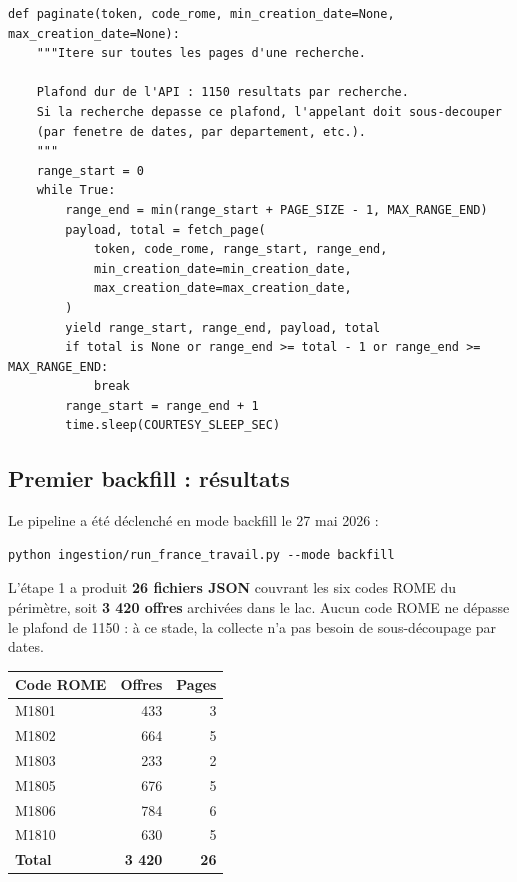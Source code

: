 \documentclass[12pt, a4paper]{article}
\begin{document}
\begin{lstlisting}[style=python]
def paginate(token, code_rome, min_creation_date=None, max_creation_date=None):
    """Itere sur toutes les pages d'une recherche.

    Plafond dur de l'API : 1150 resultats par recherche.
    Si la recherche depasse ce plafond, l'appelant doit sous-decouper
    (par fenetre de dates, par departement, etc.).
    """
    range_start = 0
    while True:
        range_end = min(range_start + PAGE_SIZE - 1, MAX_RANGE_END)
        payload, total = fetch_page(
            token, code_rome, range_start, range_end,
            min_creation_date=min_creation_date,
            max_creation_date=max_creation_date,
        )
        yield range_start, range_end, payload, total
        if total is None or range_end >= total - 1 or range_end >= MAX_RANGE_END:
            break
        range_start = range_end + 1
        time.sleep(COURTESY_SLEEP_SEC)
\end{lstlisting}

\subsection{Premier backfill : résultats}

Le pipeline a été déclenché en mode backfill le 27 mai 2026 :

\begin{lstlisting}[style=bash]
python ingestion/run_france_travail.py --mode backfill
\end{lstlisting}

L'étape 1 a produit \textbf{26 fichiers JSON} couvrant les six codes ROME du périmètre, soit \textbf{3 420 offres} archivées dans le lac. Aucun code ROME ne dépasse le plafond de 1150 : à ce stade, la collecte n'a pas besoin de sous-découpage par dates.

\begin{center}
\begin{tabular}{l r r}
\toprule
\textbf{Code ROME} & \textbf{Offres} & \textbf{Pages} \\
\midrule
M1801 & 433 & 3 \\
M1802 & 664 & 5 \\
M1803 & 233 & 2 \\
M1805 & 676 & 5 \\
M1806 & 784 & 6 \\
M1810 & 630 & 5 \\
\midrule
\textbf{Total} & \textbf{3 420} & \textbf{26} \\
\bottomrule
\end{tabular}
\end{center}
\end{document}
